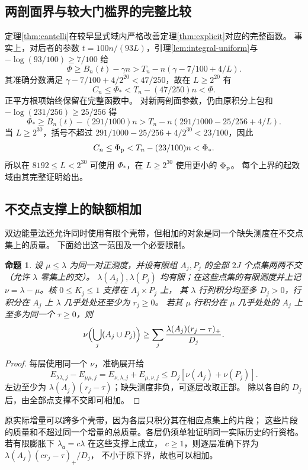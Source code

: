 \documentclass[UTF8,a4paper,11pt,fontset=fandol]{ctexart}
\newtheorem{proposition}[lemma]{命题}
\theoremstyle{remark}
\begin{document}
\subsection{两剖面界与较大门槛界的完整比较}
定理\ref{thm:cantelli}在较早显式域内严格改善定理\ref{thm:explicit}对应的完整函数。
事实上，对后者的参数 $t=100n/(93L)$，引理\ref{lem:integral-uniform}与
$-\log(93/100)\ge7/100$ 给
\[
 \Phi\ge B_n(t)-\gamma n>T_n-n(\gamma-7/100+4/L).
\]
其准确分数满足 $\gamma-7/100+4/2^{20}<47/250$，故在 $L\ge2^{20}$ 有
\[
 C_n\le\Phi_*<T_n-(47/250)n<\Phi.
\]
正平方根项始终保留在完整函数中。
对新两剖面参数，仍由原积分上包和 $-\log(231/256)\ge25/256$ 得
\[
 \Phi_*\ge B_n(t)-(291/1000)n
 >T_n-n(291/1000-25/256+4/L).
\]
当 $L\ge2^{30}$，括号不超过
$291/1000-25/256+4/2^{30}<23/100$，因此
\[
 C_n\le\Phi_{\rm p}<T_n-(23/100)n<\Phi_*.
\]
所以在 $8192\le L<2^{30}$ 可使用 $\Phi_*$，在 $L\ge2^{30}$ 使用更小的 $\Phi_{\rm p}$。
每个上界的起效域由其完整证明给出。

\subsection{不交点支撑上的缺额相加}\label{subsec:directsum}
双边能量法还允许同时使用有限个壳带，但相加的对象是同一个缺失测度在不交点集上的质量。
下面给出这一范围及一个必要限制。
\begin{proposition}\label{prop:directsum}
设 $\mu\le\lambda$ 为同一对正测度，并设有限组
$A_j,P_j$ 的全部 $2J$ 个点集两两不交（允许 $\lambda$ 零集上的交）。
$\lambda(A_j),\lambda(P_j)$ 均有限；在这些点集的有限测度并上记 $\nu=\lambda-\mu$。核 $0\le K_j\le1$ 支撑在 $A_j\times P_j$ 上，
其 $\lambda$ 行列积分均至多 $D_j>0$，行积分在 $A_j$ 上 $\lambda$ 几乎处处还至少为 $r_j\ge0$。
若其 $\mu$ 行积分在 $\mu$ 几乎处处的 $A_j$ 上至多为同一个 $\tau\ge0$，则
\[
 \nu\Bigl(\bigcup_j(A_j\cup P_j)\Bigr)
 \ge\sum_j\frac{\lambda(A_j)(r_j-\tau)_+}{D_j}.
\]
\end{proposition}
\begin{proof}
每层使用同一个 $\nu$，准确展开给
\[
 E_{\lambda\lambda,j}-E_{\mu\mu,j}
 =E_{\nu,\lambda,j}+E_{\mu,\nu,j}
 \le D_j[\nu(A_j)+\nu(P_j)].
\]
左边至少为 $\lambda(A_j)(r_j-\tau)$；缺失测度非负，可逐层改取正部。
除以各自的 $D_j$ 后，由全部点支撑不交即可相加。
\end{proof}
原实际增量可以跨多个壳带，因为各层只积分其在相应点集上的片段；
这些片段的质量和不超过同一个增量的总质量。各层仍须单独证明同一实际历史的行资格。
若有限膨胀下 $\lambda_{\mathfrak a}=c\lambda$ 在这些支撑上成立，
$c\ge1$，则逐层准确下界为 $\lambda(A_j)(cr_j-\tau)_+/D_j$，
不小于原下界，故也可以相加。
\end{document}
